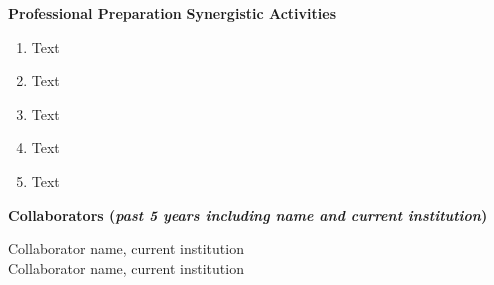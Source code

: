 \documentclass[11pt,letterpaper,english]{article}
\begin{document}
\begin{flushleft} {\bf Professional Preparation}
\vspace{.04in}
{\bf Synergistic Activities}
\vspace{-6pt}
\begin{enumerate} \itemsep1pt \parskip0pt 
\item Text \\ 
\item Text \\ 
\item Text \\ 
\item Text \\ 
\item Text \\ 
\end{enumerate} 

\vspace{-6pt}
{\bf Collaborators ({\emph{past 5 years including name and current institution}})} 
{\parindent 16pt


Collaborator name, current institution \\
Collaborator name, current institution \\
}


\end{flushleft}
\end{document}
